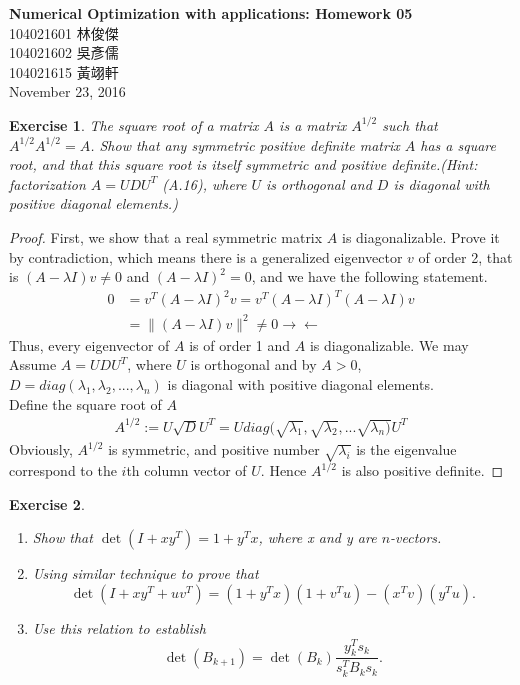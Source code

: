 \documentclass[11pt,a4paper]{article}
\renewcommand{\(}{\left(}
\renewcommand{\)}{\right)}
\renewcommand{\title}{Numerical Optimization with applications: Homework 05}
\renewcommand{\author}{104021601 林俊傑\\104021602 吳彥儒\\104021615 黃翊軒}
\renewcommand{\maketitle}{\begin{center}\textbf{\Large\title}\\[6pt] {\author}\\[6pt] {\color{Gray}\footnotesize November 23, 2016}\end{center}}
\newtheorem{exercise}{Exercise}
\begin{document}
  \maketitle
  
  \setcounter{exercise}{5}
  
  \begin{exercise}
  	The square root of a matrix $A$ is a matrix  $A^{1/2}$ such that $A^{1/2}A^{1/2}=A$. Show that any symmetric positive definite matrix $A$ has a square root, and that this square root is itself symmetric and positive definite.(Hint: factorization $A=UDU^{T}$ (A.16), where $U$ is orthogonal and $D$ is diagonal with positive diagonal elements.)
  \end{exercise}  
  \begin{proof}
  	First, we show that a real symmetric matrix $A$ is diagonalizable. Prove it by contradiction, which means there is a generalized eigenvector $v$ of order 2, that is $(A-\lambda I)v \neq 0$ and $(A-\lambda I)^{2}=0$, and we have the following statement.
  	\begin{align*}
  	0&=v^{T}(A-\lambda I)^{2}v = v^{T}(A-\lambda I)^{T}(A-\lambda I)v\\
  	&=\|(A-\lambda I)v\|^{2}\neq 0\rightarrow\leftarrow
  	\end{align*}
  	Thus, every eigenvector of $A$ is of order 1 and $A$ is diagonalizable. We may Assume $A=UDU^{T}$, where $U$ is orthogonal and by $A>0$, $D=diag(\lambda_{1},\lambda_{2},...,\lambda_{n})$ is diagonal with positive diagonal elements.\\
  	Define the square root of $A$
  	\begin{align*}
  	A^{1/2} := U\sqrt{D}U^{T}=U diag(\sqrt{\lambda_{1}},\sqrt{\lambda_{2}},...\sqrt{\lambda_{n})} U^{T}
  	\end{align*}
  	Obviously, $A^{1/2}$ is symmetric, and positive number $\sqrt{\lambda_{i}}$ is the eigenvalue correspond to the $i$th column vector of $U$. Hence $A^{1/2}$ is also positive definite.
  	
  	
  	
  	
  	
  	
  	
  	
  	
  	
  	
  \end{proof}  

  \setcounter{exercise}{9}
  \begin{exercise}
  \begin{enumerate}
  \item Show that $\det(I+xy^T)=1+y^Tx$, where x and y are $n$-vectors.
  \item Using similar technique to prove that
  \[ \det(I+xy^T+uv^T)=(1+y^Tx)(1+v^Tu)-(x^Tv)(y^Tu). \]
  \item Use this relation to establish 
  \[ \det(B_{k+1})=\det(B_k)\frac{y_k^Ts_k}{s_k^TB_ks_k}. \]
  \end{enumerate}
  \end{exercise}  
  
\end{document}
